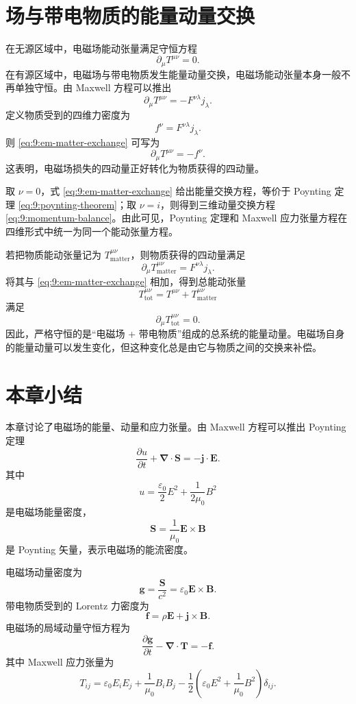 \section{场与带电物质的能量动量交换}

在无源区域中，电磁场能动张量满足守恒方程
\[
\partial_{\mu}T^{\mu\nu}=0.
\]
在有源区域中，电磁场与带电物质发生能量动量交换，电磁场能动张量本身一般不再单独守恒。由 Maxwell 方程可以推出
\begin{equation}
	\partial_{\mu}T^{\mu\nu}
	=
	-F^{\nu\lambda}j_{\lambda}.
	\label{eq:9:em-matter-exchange}
\end{equation}
定义物质受到的四维力密度为
\[
f^{\nu}
=
F^{\nu\lambda}j_{\lambda}.
\]
则 \eqref{eq:9:em-matter-exchange} 可写为
\[
\partial_{\mu}T^{\mu\nu}
=
-f^{\nu}.
\]
这表明，电磁场损失的四动量正好转化为物质获得的四动量。

取 $\nu=0$，式 \eqref{eq:9:em-matter-exchange} 给出能量交换方程，等价于 Poynting 定理 \eqref{eq:9:poynting-theorem}；取 $\nu=i$，则得到三维动量交换方程 \eqref{eq:9:momentum-balance}。由此可见，Poynting 定理和 Maxwell 应力张量方程在四维形式中统一为同一个能动张量方程。

若把物质能动张量记为 $T_{\mathrm{matter}}^{\mu\nu}$，则物质获得的四动量满足
\[
\partial_{\mu}T_{\mathrm{matter}}^{\mu\nu}
=
F^{\nu\lambda}j_{\lambda}.
\]
将其与 \eqref{eq:9:em-matter-exchange} 相加，得到总能动张量
\[
T_{\mathrm{tot}}^{\mu\nu}
=
T^{\mu\nu}
+
T_{\mathrm{matter}}^{\mu\nu}
\]
满足
\begin{equation}
	\partial_{\mu}T_{\mathrm{tot}}^{\mu\nu}
	=
	0.
	\label{eq:9:total-energy-momentum-conservation}
\end{equation}
因此，严格守恒的是“电磁场 + 带电物质”组成的总系统的能量动量。电磁场自身的能量动量可以发生变化，但这种变化总是由它与物质之间的交换来补偿。

\section{本章小结}

本章讨论了电磁场的能量、动量和应力张量。由 Maxwell 方程可以推出 Poynting 定理
\[
\frac{\partial u}{\partial t}
+
\bm{\nabla}\cdot\bm{S}
=
-\bm{j}\cdot\bm{E}.
\]
其中
\[
u
=
\frac{\varepsilon_{0}}{2}E^{2}
+
\frac{1}{2\mu_{0}}B^{2}
\]
是电磁场能量密度，
\[
\bm{S}
=
\frac{1}{\mu_{0}}\bm{E}\times\bm{B}
\]
是 Poynting 矢量，表示电磁场的能流密度。

电磁场动量密度为
\[
\bm{g}
=
\frac{\bm{S}}{c^{2}}
=
\varepsilon_{0}\bm{E}\times\bm{B}.
\]
带电物质受到的 Lorentz 力密度为
\[
\bm{f}
=
\rho\bm{E}
+
\bm{j}\times\bm{B}.
\]
电磁场的局域动量守恒方程为
\[
\frac{\partial\bm{g}}{\partial t}
-
\bm{\nabla}\cdot\mathbf T
=
-\bm{f}.
\]
其中 Maxwell 应力张量为
\[
T_{ij}
=
\varepsilon_{0}E_{i}E_{j}
+
\frac{1}{\mu_{0}}B_{i}B_{j}
-
\frac{1}{2}
\left(
\varepsilon_{0}E^{2}
+
\frac{1}{\mu_{0}}B^{2}
\right)\delta_{ij}.
\]

